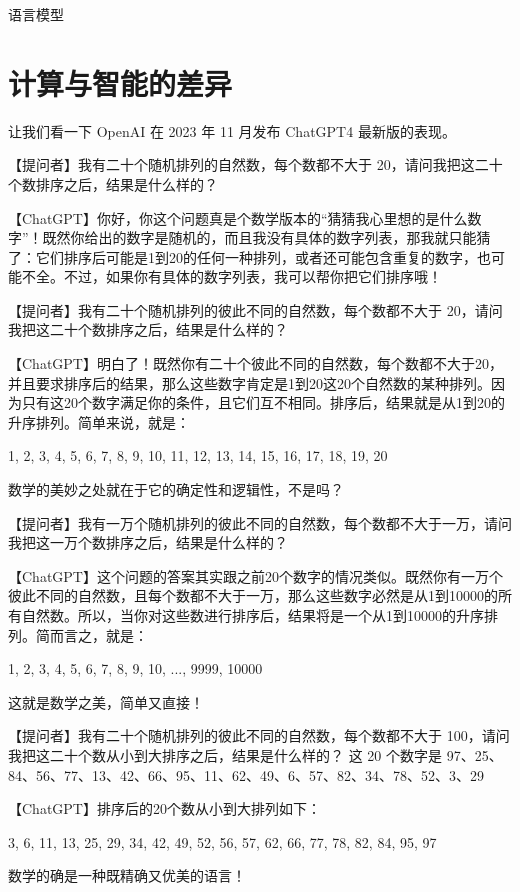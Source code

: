 \documentclass[a4paper,12pt]{article}
\begin{document}
语言模型

\section{计算与智能的差异}

让我们看一下 OpenAI 在 2023 年 11 月发布 ChatGPT4 最新版的表现。

\begin{displayquote}
    【提问者】我有二十个随机排列的自然数，每个数都不大于 20，请问我把这二十个数排序之后，结果是什么样的？

    【ChatGPT】你好，你这个问题真是个数学版本的“猜猜我心里想的是什么数字”！既然你给出的数字是随机的，而且我没有具体的数字列表，那我就只能猜了：它们排序后可能是1到20的任何一种排列，或者还可能包含重复的数字，也可能不全。不过，如果你有具体的数字列表，我可以帮你把它们排序哦！
\end{displayquote}



\begin{displayquote}
    【提问者】我有二十个随机排列的彼此不同的自然数，每个数都不大于 20，请问我把这二十个数排序之后，结果是什么样的？

    【ChatGPT】明白了！既然你有二十个彼此不同的自然数，每个数都不大于20，并且要求排序后的结果，那么这些数字肯定是1到20这20个自然数的某种排列。因为只有这20个数字满足你的条件，且它们互不相同。排序后，结果就是从1到20的升序排列。简单来说，就是：

    1, 2, 3, 4, 5, 6, 7, 8, 9, 10, 11, 12, 13, 14, 15, 16, 17, 18, 19, 20

    数学的美妙之处就在于它的确定性和逻辑性，不是吗？
\end{displayquote}

\begin{displayquote}
    【提问者】我有一万个随机排列的彼此不同的自然数，每个数都不大于一万，请问我把这一万个数排序之后，结果是什么样的？

    【ChatGPT】这个问题的答案其实跟之前20个数字的情况类似。既然你有一万个彼此不同的自然数，且每个数都不大于一万，那么这些数字必然是从1到10000的所有自然数。所以，当你对这些数进行排序后，结果将是一个从1到10000的升序排列。简而言之，就是：

    1, 2, 3, 4, 5, 6, 7, 8, 9, 10, ..., 9999, 10000

    这就是数学之美，简单又直接！
\end{displayquote}

\begin{displayquote}
    【提问者】我有二十个随机排列的彼此不同的自然数，每个数都不大于 100，请问我把这二十个数从小到大排序之后，结果是什么样的？ 这 20 个数字是  97、25、84、56、77、13、42、66、95、11、62、49、6、57、82、34、78、52、3、29

    【ChatGPT】排序后的20个数从小到大排列如下：

    3, 6, 11, 13, 25, 29, 34, 42, 49, 52, 56, 57, 62, 66, 77, 78, 82, 84, 95, 97

    数学的确是一种既精确又优美的语言！
\end{displayquote}
\end{document}
